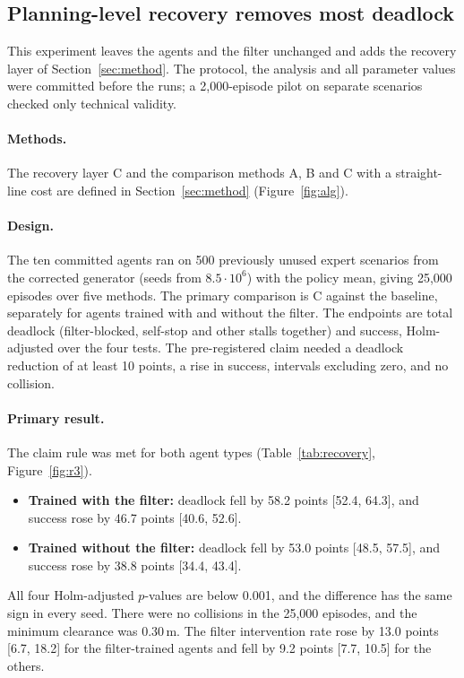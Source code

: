 \documentclass[11pt]{article}
\theoremstyle{definition}
\theoremstyle{remark}
\begin{document}
\subsection{Planning-level recovery removes most deadlock}\label{sec:recovery}
This experiment leaves the agents and the filter unchanged and adds the recovery layer of Section~\ref{sec:method}. The protocol, the analysis and all parameter values were committed before the runs; a 2{,}000-episode pilot on separate scenarios checked only technical validity.

\paragraph{Methods.} The recovery layer C and the comparison methods A, B and C with a straight-line cost are defined in Section~\ref{sec:method} (Figure~\ref{fig:alg}).

\paragraph{Design.} The ten committed agents ran on 500 previously unused expert scenarios from the corrected generator (seeds from $8.5\cdot10^6$) with the policy mean, giving 25{,}000 episodes over five methods. The primary comparison is C against the baseline, separately for agents trained with and without the filter. The endpoints are total deadlock (filter-blocked, self-stop and other stalls together) and success, Holm-adjusted over the four tests. The pre-registered claim needed a deadlock reduction of at least 10 points, a rise in success, intervals excluding zero, and no collision.

\paragraph{Primary result.} The claim rule was met for both agent types (Table~\ref{tab:recovery}, Figure~\ref{fig:r3}).
\begin{itemize}
  \item \textbf{Trained with the filter:} deadlock fell by 58.2 points [52.4, 64.3], and success rose by 46.7 points [40.6, 52.6].
  \item \textbf{Trained without the filter:} deadlock fell by 53.0 points [48.5, 57.5], and success rose by 38.8 points [34.4, 43.4].
\end{itemize}
All four Holm-adjusted $p$-values are below 0.001, and the difference has the same sign in every seed. There were no collisions in the 25{,}000 episodes, and the minimum clearance was 0.30\,m. The filter intervention rate rose by 13.0 points [6.7, 18.2] for the filter-trained agents and fell by 9.2 points [7.7, 10.5] for the others.
\end{document}
